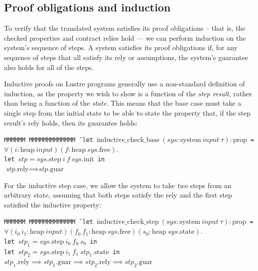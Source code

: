 \documentclass[a4paper,UKenglish,cleveref, autoref, thm-restate,anonymous]{lipics-v2021}
\begin{document}
\subsection{Proof obligations and induction}
\label{s:transition:ind}

To verify that the translated system satisfies its proof obligations -- that is, the checked properties and contract relies hold --- we can perform induction on the system's sequence of steps.
A system satisfies its proof obligations if, for any sequence of steps that all satisfy its rely or assumptions, the system's guarantee also holds for all of the steps.

Inductive proofs on Lustre programs generally use a non-standard definition of induction, as the property we wish to show is a function of the \emph{step result}, rather than being a function of the \emph{state}.
This means that the base case must take a single step from the initial state to be able to state the property that, if the step result's rely holds, then its guarantee holds:
\begin{tabbing}
  \tt{MM}\= \tt{MMMM} \= \tt{MMMMMMMMMMMMM} \= \kill
  \tt{let} $\text{inductive_check_base}~(\textit{sys}: \text{system}~\textit{input}~\tau): \text{prop}$ = \\
  \> $\forall (i: \text{heap}~\textit{input}) (f: \text{heap}~\textit{sys}\text{.free}).$ \\
  \> \tt{let} $\textit{stp} = \textit{sys}\text{.step}~ i~ f~ \textit{sys}\text{.init}$ \tt{in} \\
  \> $\textit{stp}\text{.rely} \implies \textit{stp}\text{.guar}$
\end{tabbing}

For the inductive step case, we allow the system to take \emph{two} steps from an arbitrary state, assuming that both steps satisfy the rely and the first step satisfied the inductive property:
\begin{tabbing}
  \tt{MM}\= \tt{MMMM} \= \tt{MMMMMMMMMMMMM} \= \kill
  \tt{let} $\text{inductive_check_step}~(\textit{sys}: \text{system}~\textit{input}~\tau): \text{prop}$ = \\
  \> $\forall (i_0~ i_1: \text{heap}~\textit{input}) (f_0~ f_1: \text{heap}~\textit{sys}\text{.free}) (s_0: \text{heap}~\textit{sys}\text{.state}).$ \\
  \> \tt{let} $\textit{stp}_1 = \textit{sys}\text{.step}~ i_0~ f_0~ s_0$ \tt{in} \\
  \> \tt{let} $\textit{stp}_2 = \textit{sys}\text{.step}~ i_1~ f_1~ \textit{stp}_1\text{.state}$ \tt{in} \\
  \> $\textit{stp}_1\text{.rely} \implies \textit{stp}_1\text{.guar} \implies \textit{stp}_2\text{.rely} \implies \textit{stp}_2\text{.guar}$
\end{tabbing}
\end{document}
